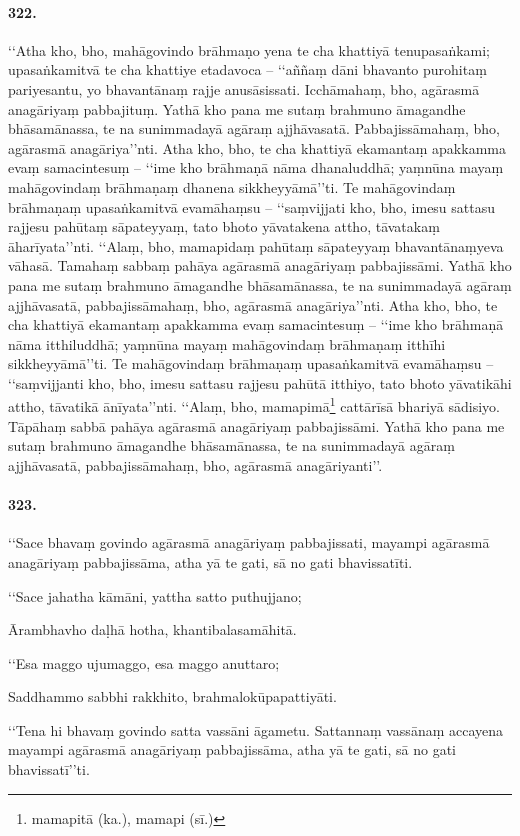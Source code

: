 \paragraph{322.} ‘‘Atha kho, bho, mahāgovindo brāhmaṇo yena te cha khattiyā tenupasaṅkami; upasaṅkamitvā te cha khattiye etadavoca – ‘‘aññaṃ dāni bhavanto purohitaṃ pariyesantu, yo bhavantānaṃ rajje anusāsissati. Icchāmahaṃ, bho, agārasmā anagāriyaṃ pabbajituṃ. Yathā kho pana me sutaṃ brahmuno āmagandhe bhāsamānassa, te na sunimmadayā agāraṃ ajjhāvasatā. Pabbajissāmahaṃ, bho, agārasmā anagāriya’’nti. Atha kho, bho, te cha khattiyā ekamantaṃ apakkamma evaṃ samacintesuṃ – ‘‘ime kho brāhmaṇā nāma dhanaluddhā; yaṃnūna mayaṃ mahāgovindaṃ brāhmaṇaṃ dhanena sikkheyyāmā’’ti. Te mahāgovindaṃ brāhmaṇaṃ upasaṅkamitvā evamāhaṃsu – ‘‘saṃvijjati kho, bho, imesu sattasu rajjesu pahūtaṃ sāpateyyaṃ, tato bhoto yāvatakena attho, tāvatakaṃ āharīyata’’nti. ‘‘Alaṃ, bho, mamapidaṃ pahūtaṃ sāpateyyaṃ bhavantānaṃyeva vāhasā. Tamahaṃ sabbaṃ pahāya agārasmā anagāriyaṃ pabbajissāmi. Yathā kho pana me sutaṃ brahmuno āmagandhe bhāsamānassa, te na sunimmadayā agāraṃ ajjhāvasatā, pabbajissāmahaṃ, bho, agārasmā anagāriya’’nti. Atha kho, bho, te cha khattiyā ekamantaṃ apakkamma evaṃ samacintesuṃ – ‘‘ime kho brāhmaṇā nāma itthiluddhā; yaṃnūna mayaṃ mahāgovindaṃ brāhmaṇaṃ itthīhi sikkheyyāmā’’ti. Te mahāgovindaṃ brāhmaṇaṃ upasaṅkamitvā evamāhaṃsu – ‘‘saṃvijjanti kho, bho, imesu sattasu rajjesu pahūtā itthiyo, tato bhoto yāvatikāhi attho, tāvatikā ānīyata’’nti. ‘‘Alaṃ, bho, mamapimā\footnote{mamapitā (ka.), mamapi (sī.)} cattārīsā bhariyā sādisiyo. Tāpāhaṃ sabbā pahāya agārasmā anagāriyaṃ pabbajissāmi. Yathā kho pana me sutaṃ brahmuno āmagandhe bhāsamānassa, te na sunimmadayā agāraṃ ajjhāvasatā, pabbajissāmahaṃ, bho, agārasmā anagāriyanti’’.

\paragraph{323.} ‘‘Sace bhavaṃ govindo agārasmā anagāriyaṃ pabbajissati, mayampi agārasmā anagāriyaṃ pabbajissāma, atha yā te gati, sā no gati bhavissatīti.

‘‘Sace jahatha kāmāni, yattha satto puthujjano;

Ārambhavho daḷhā hotha, khantibalasamāhitā.

‘‘Esa maggo ujumaggo, esa maggo anuttaro;

Saddhammo sabbhi rakkhito, brahmalokūpapattiyāti.

‘‘Tena hi bhavaṃ govindo satta vassāni āgametu. Sattannaṃ vassānaṃ accayena mayampi agārasmā anagāriyaṃ pabbajissāma, atha yā te gati, sā no gati bhavissatī’’ti.

